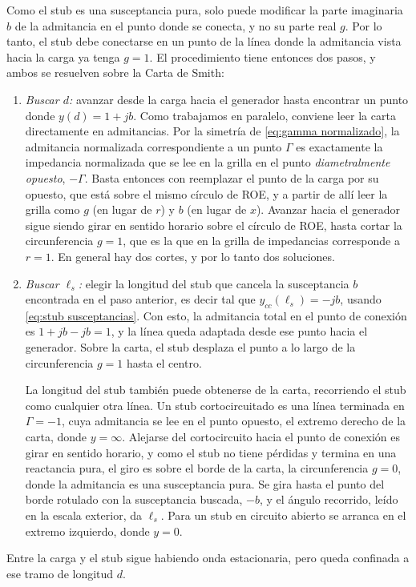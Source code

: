 Como el stub es una susceptancia pura, solo puede modificar la parte imaginaria $b$ de la admitancia en el punto donde se conecta, y no su parte real $g$. Por lo tanto, el stub debe conectarse en un punto de la línea donde la admitancia vista hacia la carga ya tenga $g=1$. El procedimiento tiene entonces dos pasos, y ambos se resuelven sobre la Carta de Smith:
\begin{enumerate}
    \item \emph{Buscar $d$:} avanzar desde la carga hacia el generador hasta encontrar un punto donde $y(d) = 1+jb$. Como trabajamos en paralelo, conviene leer la carta directamente en admitancias. Por la simetría de \eqref{eq:gamma normalizado}, la admitancia normalizada correspondiente a un punto $\Gamma$ es exactamente la impedancia normalizada que se lee en la grilla en el punto \emph{diametralmente opuesto}, $-\Gamma$. Basta entonces con reemplazar el punto de la carga por su opuesto, que está sobre el mismo círculo de ROE, y a partir de allí leer la grilla como $g$ (en lugar de $r$) y $b$ (en lugar de $x$). Avanzar hacia el generador sigue siendo girar en sentido horario sobre el círculo de ROE, hasta cortar la circunferencia $g=1$, que es la que en la grilla de impedancias corresponde a $r=1$. En general hay dos cortes, y por lo tanto dos soluciones.
    \item \emph{Buscar $\ell_s$:} elegir la longitud del stub que cancela la susceptancia $b$ encontrada en el paso anterior, es decir tal que $y_{cc}(\ell_s) = -jb$, usando \eqref{eq:stub susceptancias}. Con esto, la admitancia total en el punto de conexión es $1+jb-jb=1$, y la línea queda adaptada desde ese punto hacia el generador. Sobre la carta, el stub desplaza el punto a lo largo de la circunferencia $g=1$ hasta el centro.

    La longitud del stub también puede obtenerse de la carta, recorriendo el stub como cualquier otra línea. Un stub cortocircuitado es una línea terminada en $\Gamma=-1$, cuya admitancia se lee en el punto opuesto, el extremo derecho de la carta, donde $y=\infty$. Alejarse del cortocircuito hacia el punto de conexión es girar en sentido horario, y como el stub no tiene pérdidas y termina en una reactancia pura, el giro es sobre el borde de la carta, la circunferencia $g=0$, donde la admitancia es una susceptancia pura. Se gira hasta el punto del borde rotulado con la susceptancia buscada, $-b$, y el ángulo recorrido, leído en la escala exterior, da $\ell_s$. Para un stub en circuito abierto se arranca en el extremo izquierdo, donde $y=0$.
\end{enumerate}
Entre la carga y el stub sigue habiendo onda estacionaria, pero queda confinada a ese tramo de longitud $d$.

